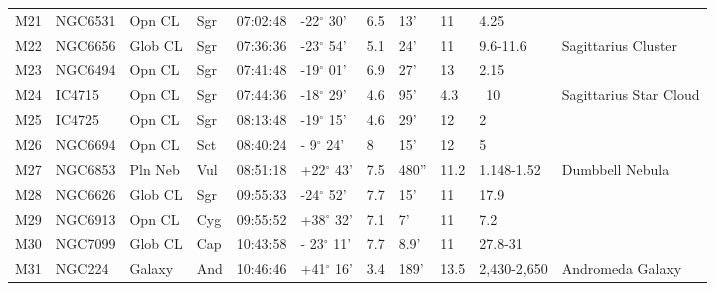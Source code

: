 \begin{longtable}{@{}lllllllllll@{}}
M21        & NGC6531     & Opn CL     & Sgr       & 07:02:48 & -22$^{\circ}$ 30'  & 6.5       & 13'                  & 11       & 4.25                &                                           \\
M22        & NGC6656     & Glob CL    & Sgr       & 07:36:36 & -23$^{\circ}$ 54'  & 5.1       & 24'                  & 11       & 9.6-11.6            & Sagittarius Cluster                       \\
M23        & NGC6494     & Opn CL     & Sgr       & 07:41:48 & -19$^{\circ}$ 01'  & 6.9       & 27'                  & 13       & 2.15                &                                           \\
M24        & IC4715      & Opn CL     & Sgr       & 07:44:36 & -18$^{\circ}$ 29'  & 4.6       & 95'                  & 4.3      & ~10                 & Sagittarius Star Cloud                    \\
M25        & IC4725      & Opn CL     & Sgr       & 08:13:48 & -19$^{\circ}$ 15'  & 4.6       & 29'                  & 12       & 2                   &                                           \\
M26        & NGC6694     & Opn CL     & Sct       & 08:40:24 & - 9$^{\circ}$ 24'  & 8         & 15'                  & 12       & 5                   &                                           \\
M27        & NGC6853     & Pln Neb    & Vul       & 08:51:18 & +22$^{\circ}$ 43'  & 7.5       & 480''                & 11.2     & 1.148-1.52          & Dumbbell Nebula                           \\
M28        & NGC6626     & Glob CL    & Sgr       & 09:55:33 & -24$^{\circ}$ 52'  & 7.7       & 15'                  & 11       & 17.9                &                                           \\
M29        & NGC6913     & Opn CL     & Cyg       & 09:55:52 & +38$^{\circ}$ 32'  & 7.1       & 7'                   & 11       & 7.2                 &                                           \\
M30        & NGC7099     & Glob CL    & Cap       & 10:43:58 & - 23$^{\circ}$ 11' & 7.7       & 8.9'                 & 11       & 27.8-31             &                                           \\
M31        & NGC224      & Galaxy     & And       & 10:46:46 & +41$^{\circ}$ 16'  & 3.4       & 189'                 & 13.5     & 2,430-2,650         & Andromeda Galaxy                          \\

\end{longtable}
